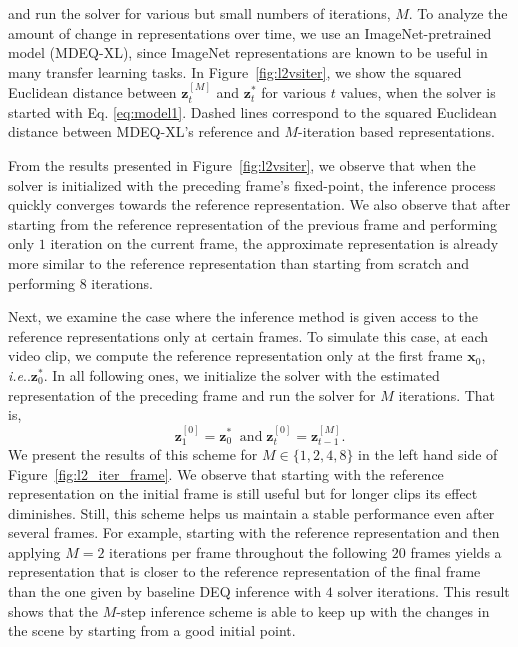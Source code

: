 \documentclass[runningheads]{llncs}
\makeatletter
\DeclareRobustCommand\onedot{\futurelet\@let@token\@onedot}
\def\@onedot{\ifx\@let@token.\else.\null\fi\xspace}
\def\ie{\emph{i.e}\onedot} \def\Ie{\emph{I.e}\onedot}
\makeatother
\begin{document}
\noindent and run the solver for various but small numbers of iterations, $M$. To analyze the amount of change in representations over time, we use an ImageNet-pretrained model (MDEQ-XL), since ImageNet representations are known to be useful in many transfer learning tasks. In  Figure~\ref{fig:l2vsiter}, we show the squared Euclidean distance between $\mathbf{z}_t^{[M]}$ and  $\mathbf{z}_t^*$ for various $t$ values, when the solver is started with Eq. \ref{eq:model1}. Dashed lines correspond to the squared Euclidean distance between MDEQ-XL’s reference and $M$-iteration based representations.


From the results presented in Figure~\ref{fig:l2vsiter}, we observe that when the solver is initialized with the preceding frame's fixed-point, the inference process quickly converges towards the reference representation.  We also observe that after starting from the reference representation of the previous frame and performing only $1$ iteration on the current frame, the approximate representation is already more similar  to the reference representation than starting from scratch and performing $8$ iterations. 


Next, we examine the case where the inference method is given access to the reference representations only at certain frames. To simulate this case, at each video clip, we compute the reference representation only at the first frame $\mathbf{x}_0$, \ie $\mathbf{z}_0^*$. In all following ones, we initialize the solver with the estimated representation of the preceding frame and run the solver for $M$ iterations. That is, 
\begin{equation}
 \mathbf{z}_1^{[0]} = \mathbf{z}_0^* \;\;\mathrm{and}\; \mathbf{z}_t^{[0]} = \mathbf{z}_{t-1}^{[M]} . \label{eq:model2}
\end{equation} 
We present the results of this scheme for $M \in \{1,2,4,8\}$ in the left hand side of Figure~\ref{fig:l2_iter_frame}. We observe that starting with the reference representation on the initial frame is still useful but for longer clips its effect diminishes. Still, this scheme helps us maintain a stable performance even after several frames. For example, starting with the reference representation and then applying $M=2$ iterations per frame throughout the following $20$ frames yields a representation that is closer to the reference representation of the final frame than the one given by baseline DEQ inference with $4$ solver iterations. This result shows that the $M$-step inference scheme is able to keep up with the changes in the scene by starting from a good initial point. 
\end{document}
